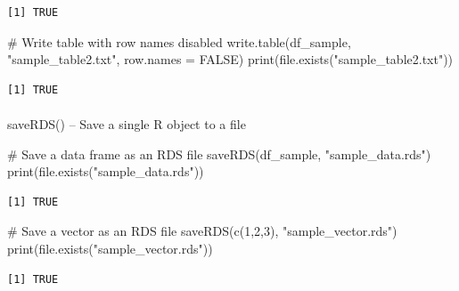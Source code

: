 \documentclass[
  letterpaper,
  DIV=11,
  numbers=noendperiod]{scrartcl}
\makeatletter
\let\oldparagraph\paragraph
\renewcommand{\paragraph}{
    \@ifstar
      \xxxParagraphStar
      \xxxParagraphNoStar
  }
\newcommand{\xxxParagraphStar}[1]{\oldparagraph*{#1}\mbox{}}
\newcommand{\xxxParagraphNoStar}[1]{\oldparagraph{#1}\mbox{}}
\newenvironment{Shaded}{\begin{snugshade}}{\end{snugshade}}
\newcommand{\AttributeTok}[1]{\textcolor[rgb]{0.40,0.45,0.13}{#1}}
\newcommand{\CommentTok}[1]{\textcolor[rgb]{0.37,0.37,0.37}{#1}}
\newcommand{\ConstantTok}[1]{\textcolor[rgb]{0.56,0.35,0.01}{#1}}
\newcommand{\DecValTok}[1]{\textcolor[rgb]{0.68,0.00,0.00}{#1}}
\newcommand{\FunctionTok}[1]{\textcolor[rgb]{0.28,0.35,0.67}{#1}}
\newcommand{\NormalTok}[1]{\textcolor[rgb]{0.00,0.23,0.31}{#1}}
\newcommand{\StringTok}[1]{\textcolor[rgb]{0.13,0.47,0.30}{#1}}
\makeatother
\begin{document}
\begin{verbatim}
[1] TRUE
\end{verbatim}

\begin{Shaded}
\begin{Highlighting}[]
\CommentTok{\#   Write table with row names disabled}
\FunctionTok{write.table}\NormalTok{(df\_sample, }\StringTok{"sample\_table2.txt"}\NormalTok{, }\AttributeTok{row.names =} \ConstantTok{FALSE}\NormalTok{)}
\FunctionTok{print}\NormalTok{(}\FunctionTok{file.exists}\NormalTok{(}\StringTok{"sample\_table2.txt"}\NormalTok{))}
\end{Highlighting}
\end{Shaded}

\begin{verbatim}
[1] TRUE
\end{verbatim}

\paragraph{saveRDS() -- Save a single R object to a
file}\label{saverds-save-a-single-r-object-to-a-file}

\begin{Shaded}
\begin{Highlighting}[]
\CommentTok{\#   Save a data frame as an RDS file}
\FunctionTok{saveRDS}\NormalTok{(df\_sample, }\StringTok{"sample\_data.rds"}\NormalTok{)}
\FunctionTok{print}\NormalTok{(}\FunctionTok{file.exists}\NormalTok{(}\StringTok{"sample\_data.rds"}\NormalTok{))}
\end{Highlighting}
\end{Shaded}

\begin{verbatim}
[1] TRUE
\end{verbatim}

\begin{Shaded}
\begin{Highlighting}[]
\CommentTok{\#   Save a vector as an RDS file}
\FunctionTok{saveRDS}\NormalTok{(}\FunctionTok{c}\NormalTok{(}\DecValTok{1}\NormalTok{,}\DecValTok{2}\NormalTok{,}\DecValTok{3}\NormalTok{), }\StringTok{"sample\_vector.rds"}\NormalTok{)}
\FunctionTok{print}\NormalTok{(}\FunctionTok{file.exists}\NormalTok{(}\StringTok{"sample\_vector.rds"}\NormalTok{))}
\end{Highlighting}
\end{Shaded}

\begin{verbatim}
[1] TRUE
\end{verbatim}
\end{document}
